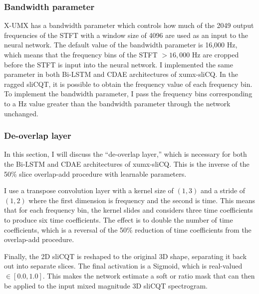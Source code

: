\documentclass[report.tex]{subfiles}
\begin{document}
\subsubsection{Bandwidth parameter}
\label{sec:bandwidth}

X-UMX has a bandwidth parameter which controls how much of the 2049 output frequencies of the STFT with a window size of 4096 are used as an input to the neural network. The default value of the bandwidth parameter is 16,000 Hz, which means that the frequency bins of the STFT $> 16,000 \text{ Hz}$ are cropped before the STFT is input into the neural network. I implemented the same parameter in both Bi-LSTM and CDAE architectures of xumx-sliCQ. In the ragged sliCQT, it is possible to obtain the frequency value of each frequency bin. To implement the bandwidth parameter, I pass the frequency bins corresponding to a Hz value greater than the bandwidth parameter through the network unchanged.


\subsubsection{De-overlap layer}
\label{sec:deoverlap}

In this section, I will discuss the ``de-overlap layer,'' which is necessary for both the Bi-LSTM and CDAE architectures of xumx-sliCQ. This is the inverse of the 50\% slice overlap-add procedure with learnable parameters.


I use a transpose convolution layer with a kernel size of $(1, 3)$ and a stride of $(1, 2)$ where the first dimension is frequency and the second is time. This means that for each frequency bin, the kernel slides and considers three time coefficients to produce six time coefficients. The effect is to double the number of time coefficients, which is a reversal of the 50\% reduction of time coefficients from the overlap-add procedure.

Finally, the 2D sliCQT is reshaped to the original 3D shape, separating it back out into separate slices. The final activation is a Sigmoid, which is real-valued $\in [0.0, 1.0]$. This makes the network estimate a soft or ratio mask that can then be applied to the input mixed magnitude 3D sliCQT spectrogram.
\end{document}
